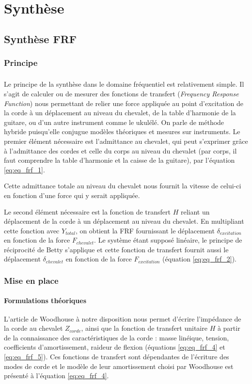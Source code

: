 \chapter{Synthèse}
\section{Synthèse FRF}

\subsection{Principe}
\paragraph*{} 

Le principe de la synthèse dans le domaine fréquentiel est relativement simple.
Il s'agit de calculer ou de mesurer des fonctions de transfert
(\textit{Frequency Response Function}) nous permettant de relier une force
appliquée au point d'excitation de la corde à un déplacement au niveau du
chevalet, de la table d'harmonie de la guitare, ou d'un autre instrument comme le ukulélé. On parle de méthode hybride puisqu'elle conjugue modèles théoriques et mesures sur instruments. Le premier élément nécessaire est l'admittance au chevalet, qui peut s'exprimer grâce à l'admittance des cordes et celle du corps au niveau du chevalet (par corps, il faut comprendre la table d'harmonie et la caisse de la guitare), par l'équation \ref{eq:eq_frf_1}.

Cette admittance totale au niveau du chevalet nous fournit la vitesse de
celui-ci en fonction d'une force qui y serait appliquée.

Le second élément nécessaire est la fonction de transfert $H$ reliant un
déplacement de la corde à un déplacement au niveau du chevalet. En multipliant cette fonction avec $Y_{total}$, on obtient la FRF fournissant le déplacement $\delta_{excitation}$ en fonction de la force $F_{chevalet}$. Le système étant supposé linéaire, le principe de réciprocité de Betty s'applique et cette fonction de transfert fournit aussi le déplacement $\delta_{chevalet}$ en fonction de la force $F_{excitation}$ (équation \ref{eq:eq_frf_2}).


\subsection{Mise en place}
\subsubsection{Formulations théoriques}
L'article de Woodhouse à notre disposition nous permet d'écrire l'impédance
de la corde au chevalet $Z_{corde}$, ainsi que la fonction de transfert
unitaire $H$ à partir de la connaissance des caractéristiques de la corde :
masse linéique, tension, coefficients d'amortissement, raideur de flexion (équations \ref{eq:eq_frf_4} et \ref{eq:eq_frf_5}). Ces fonctions de transfert sont dépendantes de l'écriture des modes de corde et le modèle de leur amortissement choisi par Woodhouse est présenté à l'équation \ref{eq:eq_frf_4}.

